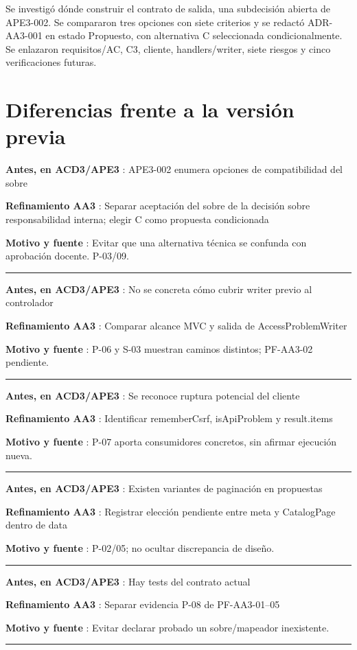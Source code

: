 \documentclass[12pt,a4paper]{report}
\begin{document}
Se investigó dónde construir el contrato de salida, una subdecisión
abierta de APE3-002. Se compararon tres opciones con siete criterios y
se redactó ADR-AA3-001 en estado Propuesto, con alternativa C
seleccionada condicionalmente. Se enlazaron requisitos/AC, C3, cliente,
handlers/writer, siete riesgos y cinco verificaciones futuras.


\section{Diferencias frente a la versión
previa}\label{nota-diferencias-frente-a-la-versiuxf3n-previa}

\textbf{Antes, en ACD3/APE3 }: APE3-002 enumera opciones de
compatibilidad del sobre

\textbf{Refinamiento AA3 }: Separar aceptación del sobre de la decisión
sobre responsabilidad interna; elegir C como propuesta condicionada

\textbf{Motivo y fuente }: Evitar que una alternativa técnica se
confunda con aprobación docente. P-03/09.

\medskip\hrule\medskip

\textbf{Antes, en ACD3/APE3 }: No se concreta cómo cubrir writer previo
al controlador

\textbf{Refinamiento AA3 }: Comparar alcance MVC y salida de
AccessProblemWriter

\textbf{Motivo y fuente }: P-06 y S-03 muestran caminos distintos;
PF-AA3-02 pendiente.

\medskip\hrule\medskip

\textbf{Antes, en ACD3/APE3 }: Se reconoce ruptura potencial del cliente

\textbf{Refinamiento AA3 }: Identificar rememberCsrf, isApiProblem y
result.items

\textbf{Motivo y fuente }: P-07 aporta consumidores concretos, sin
afirmar ejecución nueva.

\medskip\hrule\medskip

\textbf{Antes, en ACD3/APE3 }: Existen variantes de paginación en
propuestas

\textbf{Refinamiento AA3 }: Registrar elección pendiente entre meta y
CatalogPage dentro de data

\textbf{Motivo y fuente }: P-02/05; no ocultar discrepancia de diseño.

\medskip\hrule\medskip

\textbf{Antes, en ACD3/APE3 }: Hay tests del contrato actual

\textbf{Refinamiento AA3 }: Separar evidencia P-08 de PF-AA3-01--05

\textbf{Motivo y fuente }: Evitar declarar probado un sobre/mapeador
inexistente.

\medskip\hrule\medskip
\end{document}
